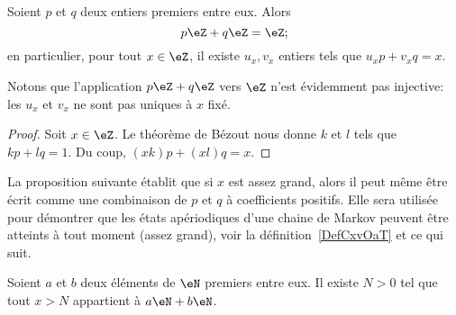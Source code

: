 \begin{corollary}       \label{CorgEMtLj}
    Soient \( p\) et \( q\) deux entiers premiers entre eux. Alors
    \begin{equation}
        p\eZ+q\eZ=\eZ;
    \end{equation}
    en particulier, pour tout \( x \in \eZ \), il existe \( u_x, v_x \) entiers tels que \(u_x p + v_x q = x \).
\end{corollary}

Notons que l'application \( p\eZ+q\eZ\) vers \( \eZ\) n'est évidemment pas injective: les $u_x$ et $v_x$ ne sont pas uniques à $x$ fixé.

\begin{proof}
    Soit \( x\in \eZ\). Le théorème de Bézout nous donne \( k\) et \( l\) tels que \( kp+lq=1\). Du coup, \( (xk)p+(xl)q=x\).
\end{proof}

La proposition suivante établit que si \( x\) est assez grand, alors il peut même être écrit comme une combinaison de \( p\) et \( q\) à coefficients positifs. Elle sera utilisée pour démontrer que les états apériodiques d'une chaine de Markov peuvent être atteints à tout moment (assez grand), voir la définition~\ref{DefCxvOaT} et ce qui suit.

\begin{proposition}     \label{PropLAbRSE}
    Soient \( a\) et \( b\) deux éléments de \( \eN\) premiers entre eux. Il existe \( N>0\) tel que tout \( x>N\) appartient à \( a\eN+b\eN\).
\end{proposition}

